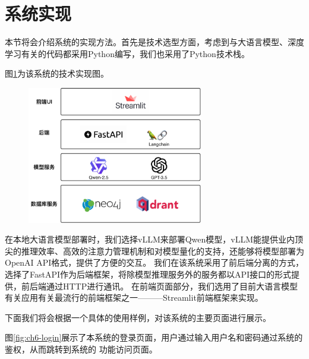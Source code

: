 \section{系统实现}

本节将会介绍系统的实现方法。首先是技术选型方面，考虑到与大语言模型、深度学习有关的代码都采用Python编写，我们也采用了Python技术栈。

图\ref{fig:ch6-implementation}为该系统的技术实现图。

\begin{figure}[H]
  \vspace{1em}
  \centering
  \setlength{\abovecaptionskip}{10pt} %
  \includegraphics[height=6cm]{../assets/ch5-系统实现图.pdf}
  \label{fig:ch6-implementation}
\end{figure}

在本地大语言模型部署时，我们选择vLLM来部署Qwen模型，vLLM能提供业内顶尖的推理效率、高效的注意力管理机制和对模型量化的支持，还能够将模型部署为OpenAI API格式，提供了方便的交互。
我们在该系统采用了前后端分离的方式，选择了FastAPI作为后端框架，将除模型推理服务外的服务都以API接口的形式提供，前后端通过HTTP进行通讯。
在前端页面部分，我们选用了目前大语言模型有关应用有关最流行的前端框架之一———Streamlit前端框架来实现。

下面我们将会根据一个具体的使用样例，对该系统的主要页面进行展示。

图\ref{fig:ch6-login}展示了本系统的登录页面，用户通过输入用户名和密码通过系统的鉴权，从而跳转到系统的
功能访问页面。

